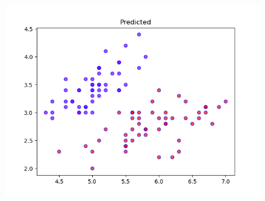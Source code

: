 \documentclass[12pt]{article}
\renewcommand{\_}{\kern-1.5pt\textunderscore\kern-1.5pt}
\begin{document}
\begin{figure}[H]
	\begin{Center}
		\includegraphics[width=5.48in,height=4.12in]{./media/image40.png}
	\end{Center}
\end{figure}



\par


\printbibliography
\end{document}
